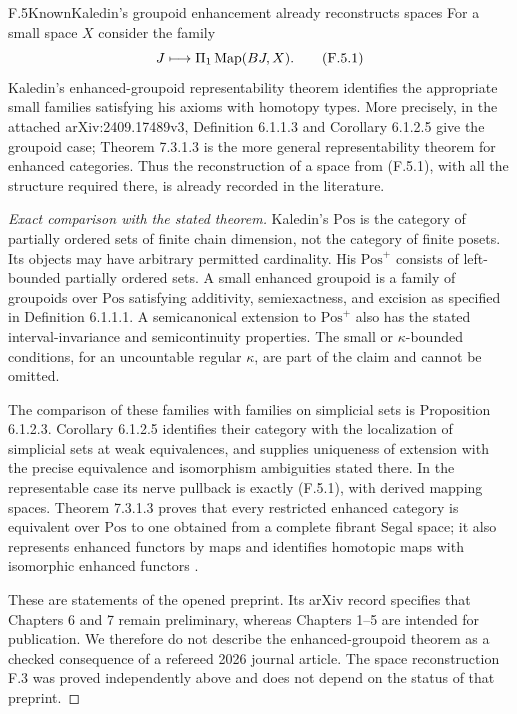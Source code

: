 \begin{claim}{F.5}{Known}{Kaledin's groupoid enhancement already reconstructs spaces}
For a small space $X$ consider the family
\[
              J\longmapsto\Pi_1\operatorname{Map}(BJ,X).                   \tag{F.5.1}
\]
Kaledin's enhanced-groupoid representability theorem identifies
the appropriate small families satisfying his axioms with homotopy
types.  More precisely, in the attached arXiv:2409.17489v3,
Definition 6.1.1.3 and Corollary 6.1.2.5 give the groupoid case;
Theorem 7.3.1.3 is the more general representability theorem for
enhanced categories.  Thus the reconstruction of a space from
(F.5.1), with all the structure required there, is already recorded
in the literature.
\end{claim}
\begin{proof}[Exact comparison with the stated theorem]
Kaledin's $\mathrm{Pos}$ is the category of partially ordered
sets of finite chain dimension, not the category of finite posets.
Its objects may have arbitrary permitted cardinality.  His
$\mathrm{Pos}^{+}$ consists of left-bounded partially ordered
sets.  A small enhanced groupoid is a family of groupoids over
$\mathrm{Pos}$ satisfying additivity, semiexactness, and excision
as specified in Definition 6.1.1.1.  A semicanonical extension to
$\mathrm{Pos}^{+}$ also has the stated interval-invariance and
semicontinuity properties.  The small or $\kappa$-bounded
conditions, for an uncountable regular $\kappa$, are part of the
claim and cannot be omitted.

The comparison of these families with families on simplicial sets
is Proposition 6.1.2.3.  Corollary 6.1.2.5 identifies their category
with the localization of simplicial sets at weak equivalences,
and supplies uniqueness of extension with the precise equivalence
and isomorphism ambiguities stated there.  In the representable
case its nerve pullback is exactly (F.5.1), with derived mapping
spaces.  Theorem 7.3.1.3 proves that every restricted enhanced
category is equivalent over $\mathrm{Pos}$ to one obtained from
a complete fibrant Segal space; it also represents enhanced
functors by maps and identifies homotopic maps with isomorphic
enhanced functors \citep{EF_Kaledin2026}.

These are statements of the opened preprint.  Its arXiv record
specifies that Chapters 6 and 7 remain preliminary, whereas
Chapters 1--5 are intended for publication.  We therefore do not
describe the enhanced-groupoid theorem as a checked consequence of
a refereed 2026 journal article.  The space reconstruction F.3 was
proved independently above and does not depend on the status of
that preprint.
\end{proof}

